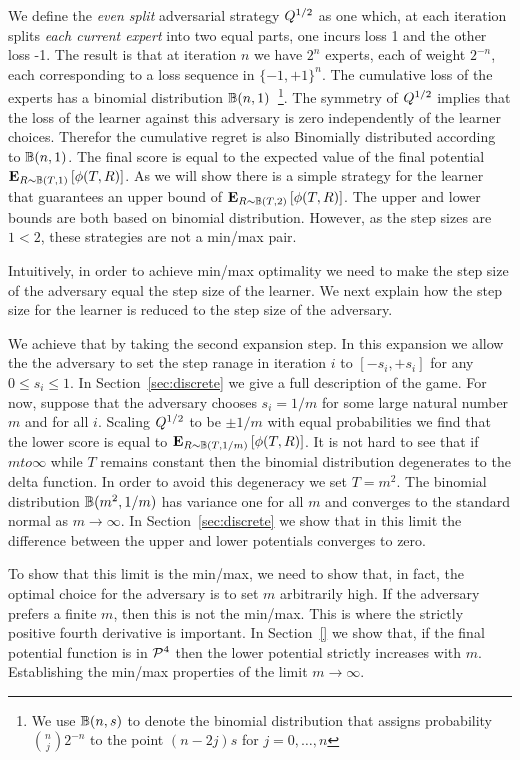 \documentclass[12pt]{article} %
\begin{document}
We define the {\em even split} adversarial strategy $Q^{1/2}$ as
one which, at each iteration splits {\em each current expert} into two equal parts,
one incurs loss 1 and the other loss -1. The result is that at
iteration $n$ we have $2^n$ experts, each of weight $2^{-n}$, each
corresponding to a loss sequence in $\{-1,+1\}^n$. The cumulative loss
of the experts has a binomial distribution
$\mathbb{B}(n,1)$~\footnote{\label{def:binomial} We use
  $\mathbb{B}(n,s)$ to denote the binomial distribution that assigns
  probability ${n \choose j} 2^{-n}$ to the point $(n-2j)s$ for
  $j=0,\ldots,n$}. The symmetry of $Q^{1/2}$ implies that the loss
of the learner against this adversary is zero independently of the
learner choices. Therefor the cumulative regret is also Binomially
distributed according to $\mathbb{B}(n,1)$.  The final score is equal to the
expected value of the final potential
${\bf E}_{R \sim \mathbb{B}(T,1)}\left[ \phi(T,R) \right]$. 
As we will show there is a simple strategy
for the learner that guarantees an upper bound of ${\bf E}_{R \sim \mathbb{B}(T,2)}\left[ \phi(T,R) \right]$. 
The upper and lower bounds are both based on binomial
distribution. However, as the step sizes are $1 <2$, these
strategies are not a min/max pair.

Intuitively, in order to achieve min/max optimality we need to make
the step size of the adversary equal the step size of the learner. We
next explain how the step size for the learner is reduced to the step
size of the adversary. 

We achieve that by taking the second expansion step.
In this expansion we allow the the adversary to set the step ranage in
iteration $i$ to $[-s_i,+s_i]$ for any $0 \leq s_i \leq 1$. In
Section~\ref{sec:discrete} we give a full description of the game.
For now, suppose that the adversary chooses $s_i=1/m$ for some large natural
number $m$ and for all $i$. Scaling $Q^{1/2}$ to be $\pm 1/m$ with
equal probabilities we find that the lower score is equal to
${\bf E}_{R \sim \mathbb{B}(T,1/m)}\left[ \phi(T,R) \right]$. It is not hard to see that if
$m to \infty$ while $T$ remains constant then the binomial
distribution degenerates to the delta function. In order to avoid this
degeneracy we set $T=m^2$. The binomial distribution
$\mathbb{B}(m^2,1/m)$ has variance one for all $m$ and converges to the
standard normal as $m \to \infty$. In Section~\ref{sec:discrete} we
show that in this limit the difference between the upper and lower
potentials converges to zero.

To show that this limit is the min/max, we need to show that, in fact,
the optimal choice for the adversary is to set $m$ arbitrarily
high. If the adversary prefers a finite $m$, then this is not the
min/max. This is where the strictly positive fourth derivative is
important. In Section~\ref{} we show that, if the final potential
function is in ${\cal P}^{4}$ then the lower potential strictly increases
with $m$.  Establishing the min/max properties of the limit
$m \to \infty$.
\end{document}
